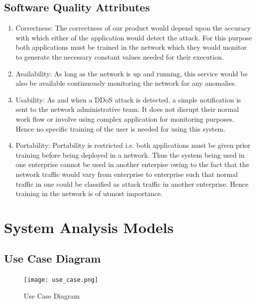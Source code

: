 \documentclass[12pt,a4paper,final]{report}
\begin{document}
\subsection{Software Quality Attributes}
\begin{enumerate}
\item Correctness:
\newline
The correctness of our product would depend upon the accuracy with which either of the application would detect the attack. For this purpose both applications must be trained in the network which they would monitor to generate the necessary constant values needed for their execution.

\item Availability:
\newline
As long as the network is up and running, this service would be also be available continuously monitoring the network for any anomalies.

\item Usability: 
\newline
As and when a DDoS attack is detected, a simple notification is sent to the network administrative team. It does not disrupt their normal work flow or involve using complex application for monitoring purposes. Hence no specific training of the user is needed for using this system. 

\item Portability: 
\newline
Portability is restricted i.e. both applications must be given prior training before being deployed in a network. Thus the system being used in one enterprise cannot be used in another enterpise owing to the fact that the network traffic would vary from enterprise to enterprise such that normal traffic in one could be classified as attack traffic in another enterprise. Hence training in the network is of utmost importance.
\end{enumerate}

\newpage
\section{System Analysis Models}
\subsection{Use Case Diagram}
\begin{figure}[h]
\begin{center}
\texttt{[image: use\_case.png]}
\caption{Use Case Diagram}
\end{center}
\end{figure}
\end{document}
